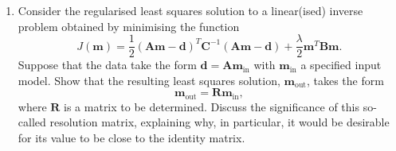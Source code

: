 \begin{enumerate}
\begin{enumerate}
$(q^{2}-\eta_{1}^{2})^{-1/2}$, integrate over $q$ from $\eta_{1}$ to $\eta_{b}$, and exchange the order of integration to show that
\begin{equation*}
    \ln\frac{b}{r_{1}}=\frac{1}{\pi}\int_{\eta_{1}}^{\eta_{b}}\frac{\Delta(q)}{\sqrt{q^{2}-\eta_{1}^{2}}}\dd q.
\end{equation*}
You may use the identity
\begin{equation*}
    \int_{\eta_{1}}^{\eta}\frac{q\,\dd q}{\sqrt{(\eta^{2}-q^{2})(q^{2}-\eta_{1}^{2})}}=\frac{\pi}{2}.
\end{equation*}
By integrating by parts, show that this can equally be written in terms of the observed travel-time curve as
\begin{equation*}
    \ln\frac{b}{r_{1}}=\frac{1}{\pi}\int_{0}^{\Delta_{1}}\cosh^{-1}\!\left[\frac{q(\Delta)}{\eta_{1}}\right]\dd\Delta,
\end{equation*}
where $\Delta_{1}=\Delta(\eta_{1})$ and $q(\Delta)=\dd T/\dd\Delta$.
\item Explain how these results allow $\alpha(r)$ to be determined from a travel-time curve, working downwards from the surface. 
What goes wrong if there is a region in which the velocity decreases with depth so rapidly that $\eta$ is no longer monotonic? 
And what is seen in the travel-time curve at a discontinuity across which the velocity increases with depth?
\end{enumerate}

\item Consider the regularised least squares solution to a linear(ised) inverse problem obtained by minimising the function
\begin{equation*}
    J(\mathbf{m})=\frac{1}{2}(\mathbf{A}\mathbf{m}-\mathbf{d})^{T}\mathbf{C}^{-1}(\mathbf{A}\mathbf{m}-\mathbf{d})+\frac{\lambda}{2}\mathbf{m}^{T}\mathbf{B}\mathbf{m}.
\end{equation*}
Suppose that the data take the form $\mathbf{d}=\mathbf{A}\mathbf{m}_{\mathrm{in}}$ with $\mathbf{m}_{\mathrm{in}}$ a specified input model. Show that the resulting least squares solution, $\mathbf{m}_{\mathrm{out}}$, takes the form
\begin{equation*}
    \mathbf{m}_{\mathrm{out}}=\mathbf{R}\mathbf{m}_{\mathrm{in}},
\end{equation*}
where $\mathbf{R}$ is a matrix to be determined. Discuss the significance of this so-called resolution matrix, explaining why, in particular, it would be desirable for its value to be close to the identity matrix.


\end{enumerate}
